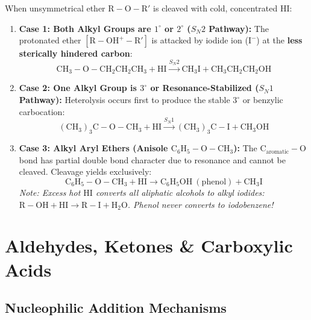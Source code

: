 \documentclass[10pt,a4paper]{article}
\begin{document}
\begin{formulabox}
When unsymmetrical ether $\mathrm{R-O-R'}$ is cleaved with cold, concentrated $\mathrm{HI}$:
\begin{enumerate}[leftmargin=*]
  \item \textbf{Case 1: Both Alkyl Groups are $1^\circ$ or $2^\circ$ ($S_N2$ Pathway):}
  The protonated ether $[\mathrm{R-OH^+-R'}]$ is attacked by iodide ion ($\mathrm{I^-}$) at the \textbf{less sterically hindered carbon}:
  \begin{equation}
    \mathrm{CH_3-O-CH_2CH_2CH_3} + \mathrm{HI} \xrightarrow{S_N2} \mathbf{\mathrm{CH_3I}} + \mathrm{CH_3CH_2CH_2OH}
  \end{equation}
  \item \textbf{Case 2: One Alkyl Group is $3^\circ$ or Resonance-Stabilized ($S_N1$ Pathway):}
  Heterolysis occurs first to produce the stable $3^\circ$ or benzylic carbocation:
  \begin{equation}
    \mathrm{(CH_3)_3C-O-CH_3} + \mathrm{HI} \xrightarrow{S_N1} \mathbf{\mathrm{(CH_3)_3C-I}} + \mathrm{CH_3OH}
  \end{equation}
  \item \textbf{Case 3: Alkyl Aryl Ethers (Anisole $\mathrm{C_6H_5-O-CH_3}$):}
  The $\mathrm{C_{aromatic}-O}$ bond has partial double bond character due to resonance and cannot be cleaved. Cleavage yields exclusively:
  \begin{equation}
    \mathrm{C_6H_5-O-CH_3} + \mathrm{HI} \longrightarrow \mathbf{\mathrm{C_6H_5OH}} \ (\text{phenol}) + \mathbf{\mathrm{CH_3I}}
  \end{equation}
  \textit{Note: Excess hot $\mathrm{HI}$ converts all aliphatic alcohols to alkyl iodides: $\mathrm{R-OH} + \mathrm{HI} \to \mathrm{R-I} + \mathrm{H_2O}$. Phenol never converts to iodobenzene!}
\end{enumerate}
\end{formulabox}

\section{Aldehydes, Ketones \& Carboxylic Acids}

\subsection{Nucleophilic Addition Mechanisms}
\end{document}
